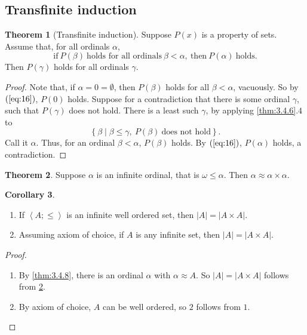 \documentclass{article}
\newcommand{\rb}[1]{\left( #1 \right)}
\newcommand{\cb}[1]{\left\{ #1 \right\}}
\newcommand{\ab}[1]{\left\langle #1 \right\rangle}
\newcommand{\abs}[1]{\left\lvert #1 \right\rvert}
\theoremstyle{definition}\newtheorem{definition}{Definition}[subsection]
\theoremstyle{definition}\newtheorem{remark1}[definition]{Remark}
\theoremstyle{definition}\newtheorem{example1}[definition]{Example}
\theoremstyle{definition}\newtheorem*{remark2}{Remark}
\theoremstyle{definition}\newtheorem*{example2}{Example}
\theoremstyle{definition}\newtheorem*{note}{Note}
\theoremstyle{definition}\newtheorem*{notation}{Notation}
\newtheorem{theorem}[definition]{Theorem}
\newtheorem{corollary}[definition]{Corollary}
\begin{document}
\subsection{Transfinite induction}

\begin{theorem}[Transfinite induction]
\label{thm:3.5.1}
Suppose $ P\rb{x} $ is a property of sets. Assume that, for all ordinals $ \alpha $,
\begin{equation}
\label{eq:16}
\text{if} \ P\rb{\beta} \ \text{holds for all ordinals} \ \beta < \alpha, \ \text{then} \ P\rb{\alpha} \ \text{holds}.
\end{equation}
Then $ P\rb{\gamma} $ holds for all ordinals $ \gamma $.
\end{theorem}

\begin{proof}
Note that, if $ \alpha = 0 = \emptyset $, then $ P\rb{\beta} $ holds for all $ \beta < \alpha $, vacuously. So by $ \rb{\ref{eq:16}} $, $ P\rb{0} $ holds. Suppose for a contradiction that there is some ordinal $ \gamma $, such that $ P\rb{\gamma} $ does not hold. There is a least such $ \gamma $, by applying \ref{thm:3.4.6}.$ 4 $ to
$$ \cb{\beta \mid \beta \le \gamma, \ P\rb{\beta} \ \text{does not hold}}. $$
Call it $ \alpha $. Thus, for an ordinal $ \beta < \alpha $, $ P\rb{\beta} $ holds. By $ \rb{\ref{eq:16}} $, $ P\rb{\alpha} $ holds, a contradiction.
\end{proof}

\pagebreak

\begin{theorem}
\label{thm:3.5.2}
Suppose $ \alpha $ is an infinite ordinal, that is $ \omega \le \alpha $. Then $ \alpha \approx \alpha \times \alpha $.
\end{theorem}

\begin{corollary}
\label{cor:3.5.3}
\hfill
\begin{enumerate}
\item If $ \ab{A; \le} $ is an infinite well ordered set, then $ \abs{A} = \abs{A \times A} $.
\item Assuming axiom of choice, if $ A $ is any infinite set, then $ \abs{A} = \abs{A \times A} $.
\end{enumerate}
\end{corollary}

\begin{proof}
\hfill
\begin{enumerate}
\item By \ref{thm:3.4.8}, there is an ordinal $ \alpha $ with $ \alpha \approx A $. So $ \abs{A} = \abs{A \times A} $ follows from \ref{thm:3.5.2}.
\item By axiom of choice, $ A $ can be well ordered, so $ 2 $ follows from $ 1 $.
\end{enumerate}
\end{proof}
\end{document}
